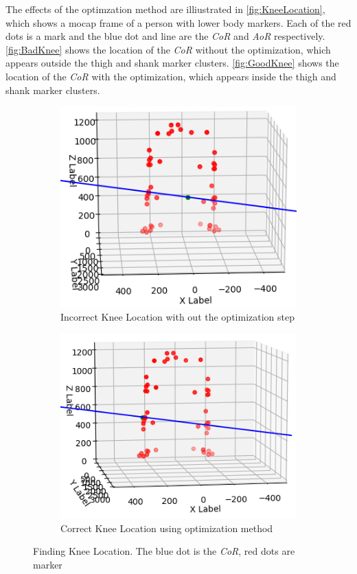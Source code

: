 The effects of the optimzation method are illiustrated in \autoref{fig:KneeLocation}, which shows a mocap frame of a person with lower body markers. Each of the red dots is a mark and the blue dot and line are the \textit{CoR} and \textit{AoR} respectively. \autoref{fig:BadKnee} shows the location of the \textit{CoR} without the optimization, which appears outside the thigh and shank marker clusters. \autoref{fig:GoodKnee} shows the location of the \textit{CoR} with the optimization, which appears inside the thigh and shank marker clusters.



\begin{figure}[]
    \centering
    \begin{subfigure}{.45\textwidth}
        \centering
        \includegraphics[scale=0.40]{images/software/bad_knee.png}
        \caption[Incorrect Knee Location]{Incorrect Knee Location with out the optimization step}
        \label{fig:BadKnee}
    \end{subfigure}%
    \hfill
    \begin{subfigure}{.45\textwidth}
        \centering
        \includegraphics[scale=0.40]{images/software/good_knee.png}
        \caption[Correct Knee Location]{Correct Knee Location using optimization method}
        \label{fig:GoodKnee}
    \end{subfigure}
    \caption[Finding Knee location]{Finding Knee Location. The blue dot is the \textit{CoR}, red dots are marker}
    \label{fig:KneeLocation}
\end{figure}


